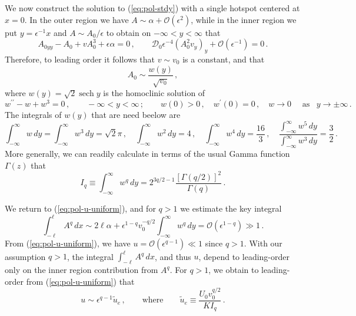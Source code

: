 \documentclass{article}%
\DeclareMathOperator{\sech}{sech}
\begin{document}
We now construct the solution to (\ref{eq:pol-stdy}) with a single
hotspot centered at $x=0$. In the outer region we have
$A\sim\alpha+{\mathcal O}(\epsilon^{2})$, while in the inner region we
put $y=\epsilon^{-1}x$ and $A\sim A_{0}/\epsilon$ to obtain on
$-\infty<y<\infty$ that
\begin{equation*}
A_{0yy}-A_{0}+vA_{0}^{3}+\epsilon\alpha = 0 \,, \qquad
{\mathcal D}_{0}\epsilon^{-4}\left(A_{0}^{2}v_{y}\right)_{y}+{\mathcal
  O}(\epsilon^{-1}) = 0\,.
\end{equation*}
Therefore, to leading order it follows that $v\sim v_{0}$ is a constant,
and that
\begin{equation}
A_{0} \sim \frac{w(y)}{\sqrt{v_{0}}} \,, \label{eq:pol-A-leading}
\end{equation}
where $w(y)=\sqrt{2}\sech y$ is the homoclinic solution of 
\begin{equation}\label{wground}
 w^{\prime\prime}-w+w^{3}=0\,,\qquad-\infty<y<\infty\,; \qquad
w(0)>0\,,\quad w^{\prime}(0)=0\,,\quad w\to0 \quad \mbox{ as }\,\,\, 
y\to\pm\infty\,.
\end{equation}
The integrals of $w(y)$ that are need beelow are
\begin{equation}\label{ss:int} 
 \int_{-\infty}^{\infty}w \, dy=
\int_{-\infty}^{\infty}w^{3} \, dy=\sqrt{2}\pi\,, \quad
\int_{-\infty}^{\infty}w^{2}\,dy=4\,,\quad\int_{-\infty}^{\infty}w^{4}\, dy=
  \frac{16}{3}\,, 
\quad \frac{\int_{-\infty}^{\infty}w^{5}\, dy}{\int_{-\infty}^{\infty}w^{3}\,dy}
 =\frac{3}{2}\,.
\end{equation}
More generally, we can readily calculate in terms of the usual Gamma 
function $\Gamma(z)$ that
\begin{equation}\label{eq:I_q-general-formula}
I_{q}\equiv \int_{-\infty}^{\infty}w^{q}\, dy=
2^{3q/2-1}\frac{\left[\Gamma(q/2)\right]^2}{\Gamma(q)}\,.
\end{equation}

We return to (\ref{eq:pol-u-uniform}), and for $q>1$ we estimate the key 
integral
\[
\int_{-\ell}^{\ell}A^{q}\, dx\sim 2\ell\alpha+\epsilon^{1-q}v_{0}^{-q/2}
\int_{-\infty}^{\infty}w^{q} \, dy= {\mathcal O}(\epsilon^{1-q}) \gg 1 \,.
\]
From (\ref{eq:pol-u-uniform}), we have $u={\mathcal
  O}(\epsilon^{q-1})\ll 1$ since $q>1$.  With our assumption 
$q>1$, the integral $\int_{-\ell}^{\ell}A^{q}\, dx$, and thus $u$, depend
to leading-order only on the inner region contribution from
$A^{q}$. For $q>1$, we obtain to leading-order 
from (\ref{eq:pol-u-uniform}) that 
\begin{equation}
  u\sim\epsilon^{q-1}\tilde{u}_{e}\,, \qquad 
\mbox{where} \qquad \tilde{u}_{e} \equiv
\frac{U_{0} v_{0}^{q/2}}{K I_{q}}\,.\label{eq:pol-u-leading}
\end{equation}
\end{document}
